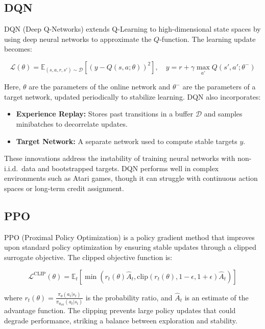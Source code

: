 \subsection{DQN}

DQN (Deep Q-Networks) extends Q-Learning to high-dimensional state spaces by using deep neural networks to approximate the $Q$-function. The learning update becomes:

\[
\mathcal{L}(\theta) = \mathbb{E}_{(s,a,r,s') \sim \mathcal{D}} \left[ \left( y - Q(s,a;\theta) \right)^2 \right], \quad y = r + \gamma \max_{a'} Q(s', a'; \theta^{-})
\]

Here, $\theta$ are the parameters of the online network and $\theta^{-}$ are the parameters of a target network, updated periodically to stabilize learning. DQN also incorporates:
\begin{itemize}
  \item \textbf{Experience Replay:} Stores past transitions in a buffer $\mathcal{D}$ and samples minibatches to decorrelate updates.
  \item \textbf{Target Network:} A separate network used to compute stable targets $y$.
\end{itemize}

\vspace{0.5em}
These innovations address the instability of training neural networks with non-i.i.d.\ data and bootstrapped targets. DQN performs well in complex environments such as Atari games, though it can struggle with continuous action spaces or long-term credit assignment.

\subsection{PPO}

PPO (Proximal Policy Optimization) is a policy gradient method that improves upon standard policy optimization by ensuring stable updates through a clipped surrogate objective. The clipped objective function is:

\[
\mathcal{L}^{\text{CLIP}}(\theta) = \mathbb{E}_t \left[ \min \left( r_t(\theta) \hat{A}_t, \text{clip}(r_t(\theta), 1 - \epsilon, 1 + \epsilon) \hat{A}_t \right) \right]
\]

where $r_t(\theta) = \frac{\pi_\theta(a_t|s_t)}{\pi_{\theta_{\text{old}}}(a_t|s_t)}$ is the probability ratio, and $\hat{A}_t$ is an estimate of the advantage function. The clipping prevents large policy updates that could degrade performance, striking a balance between exploration and stability.

